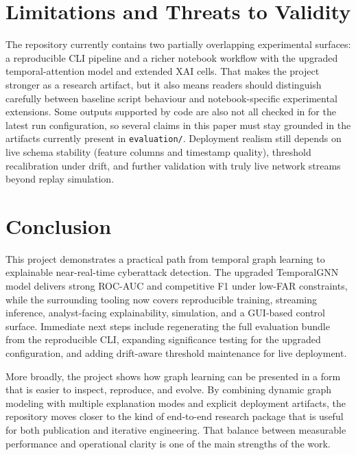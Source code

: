 \documentclass[conference]{IEEEtran}
\begin{document}

\section{Limitations and Threats to Validity}
The repository currently contains two partially overlapping experimental surfaces: a reproducible CLI pipeline and a richer notebook workflow with the upgraded temporal-attention model and extended XAI cells. That makes the project stronger as a research artifact, but it also means readers should distinguish carefully between baseline script behaviour and notebook-specific experimental extensions. Some outputs supported by code are also not all checked in for the latest run configuration, so several claims in this paper must stay grounded in the artifacts currently present in \texttt{evaluation/}. Deployment realism still depends on live schema stability (feature columns and timestamp quality), threshold recalibration under drift, and further validation with truly live network streams beyond replay simulation.

\section{Conclusion}
This project demonstrates a practical path from temporal graph learning to explainable near-real-time cyberattack detection. The upgraded TemporalGNN model delivers strong ROC-AUC and competitive F1 under low-FAR constraints, while the surrounding tooling now covers reproducible training, streaming inference, analyst-facing explainability, simulation, and a GUI-based control surface. Immediate next steps include regenerating the full evaluation bundle from the reproducible CLI, expanding significance testing for the upgraded configuration, and adding drift-aware threshold maintenance for live deployment.

More broadly, the project shows how graph learning can be presented in a form that is easier to inspect, reproduce, and evolve. By combining dynamic graph modeling with multiple explanation modes and explicit deployment artifacts, the repository moves closer to the kind of end-to-end research package that is useful for both publication and iterative engineering. That balance between measurable performance and operational clarity is one of the main strengths of the work.\\
\\
\\
\\
\\
\\



\end{document}

